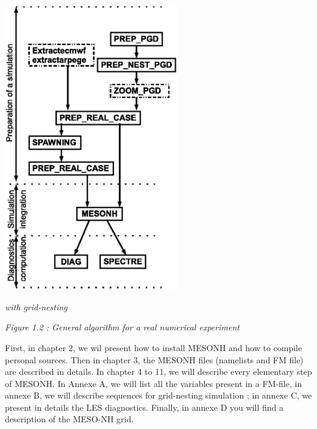 \begin{minipage}{9cm}
\includegraphics[width=7.5cm]{intro/magie}
\begin{center}
\textit{with grid-nesting}
\end{center}
\end{minipage}
\begin{center}
\textit{Figure 1.2 : General algorithm for a real numerical experiment}
\end{center}




\newpage



First, in chapter 2, we wil present how to install MESONH and how to compile 
personal sources.
Then in chapter 3, the MESONH files (namelists and FM file) are described in details.
In chapter 4 to 11, we will describe every elementary step of MESONH.
In Annexe A,  we will list all the variables present in a FM-file, in annexe B, we will describe sequences for grid-nesting simulation ; in annexe C, we present in details the LES diagnostics. Finally, in annexe D you will find a description of the MESO-NH grid.
 
